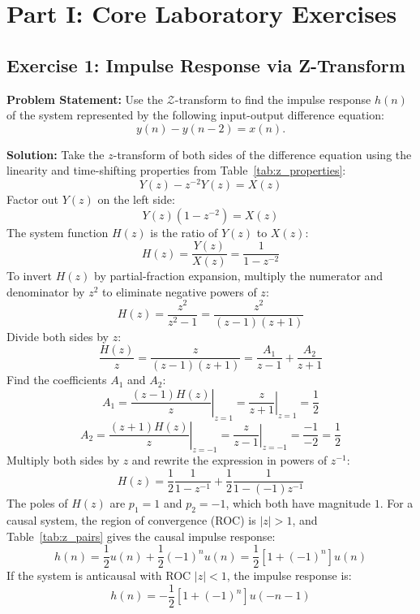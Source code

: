 \documentclass[12pt,a4paper]{article}
\begin{document}
\newpage

\section{Part I: Core Laboratory Exercises}

\subsection{Exercise 1: Impulse Response via Z-Transform}
\textbf{Problem Statement:} Use the $\mathcal{Z}$-transform to find the impulse response $h(n)$ of the system represented by the following input-output difference equation:
\begin{equation}
    y(n) - y(n-2) = x(n).
    \label{eq:ex1_diff}
\end{equation}

\textbf{Solution:}
Take the $z$-transform of both sides of the difference equation using the linearity and time-shifting properties from Table~\ref{tab:z_properties}:
\[
Y(z) - z^{-2}Y(z) = X(z)
\]
Factor out $Y(z)$ on the left side:
\[
Y(z)(1 - z^{-2}) = X(z)
\]
The system function $H(z)$ is the ratio of $Y(z)$ to $X(z)$:
\[
H(z) = \frac{Y(z)}{X(z)} = \frac{1}{1 - z^{-2}}
\]
To invert $H(z)$ by partial-fraction expansion, multiply the numerator and denominator by $z^2$ to eliminate negative powers of $z$:
\[
H(z) = \frac{z^2}{z^2 - 1} = \frac{z^2}{(z - 1)(z + 1)}
\]
Divide both sides by $z$:
\[
\frac{H(z)}{z} = \frac{z}{(z - 1)(z + 1)} = \frac{A_1}{z - 1} + \frac{A_2}{z + 1}
\]
Find the coefficients $A_1$ and $A_2$:
\[
A_1 = \left. \frac{(z - 1)H(z)}{z} \right|_{z = 1} = \left. \frac{z}{z + 1} \right|_{z = 1} = \frac{1}{2}
\]
\[
A_2 = \left. \frac{(z + 1)H(z)}{z} \right|_{z = -1} = \left. \frac{z}{z - 1} \right|_{z = -1} = \frac{-1}{-2} = \frac{1}{2}
\]
Multiply both sides by $z$ and rewrite the expression in powers of $z^{-1}$:
\[
H(z) = \frac{1}{2}\frac{1}{1 - z^{-1}} + \frac{1}{2}\frac{1}{1 - (-1)z^{-1}}
\]
The poles of $H(z)$ are $p_1 = 1$ and $p_2 = -1$, which both have magnitude $1$. For a causal system, the region of convergence (ROC) is $|z| > 1$, and Table~\ref{tab:z_pairs} gives the causal impulse response:
\[
h(n) = \frac{1}{2}u(n) + \frac{1}{2}(-1)^n u(n) = \frac{1}{2}\left[1 + (-1)^n\right]u(n)
\]
If the system is anticausal with ROC $|z| < 1$, the impulse response is:
\[
h(n) = -\frac{1}{2}\left[1 + (-1)^n\right]u(-n - 1)
\]
\end{document}
